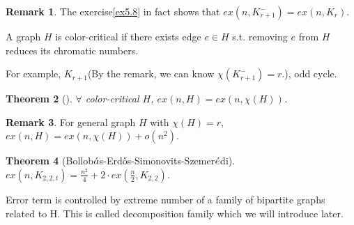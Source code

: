 \documentclass{article}
\newtheorem{theorem}{Theorem}[section]
\theoremstyle{definition}
\newtheorem{remark}[theorem]{Remark}
\def\Erdos{Erd\H{o}s}
\begin{document}
\begin{remark}
   The exercise\ref{ex5.8} in fact shows that $ex(n,K_{r+1}^-)=ex(n,K_r)$. 
\end{remark}
A graph $H$ is color-critical if there exists edge $e\in H$ s.t. removing $e$ from $H$ reduces its chromatic numbers.

For example, $K_{r+1}$(By the remark, we can know $\chi(K_{r+1}^-)=r$.), odd cycle.

\begin{theorem}[\cite{1968A}]
    $\forall$ color-critical $H$, $ex(n,H)=ex(n,\chi(H))$.
\end{theorem}
\begin{remark}
    For general graph $H$ with $\chi(H)=r$, $ex(n,H)=ex(n,\chi(H))+o(n^2)$.
\end{remark}
\begin{theorem}[Bollob$\Acute{a}$s-\Erdos{}-Simonovits-Szemer$\Acute{e}$di]
    $ex(n,K_{2,2,t})=\frac{n^2}{4}+2\cdot ex(\frac{n}{2}, K_{2,2})$.
\end{theorem}
Error term is controlled by extreme number of a family of bipartite graphs related to H. This is called decomposition family which we will introduce later.
\end{document}
